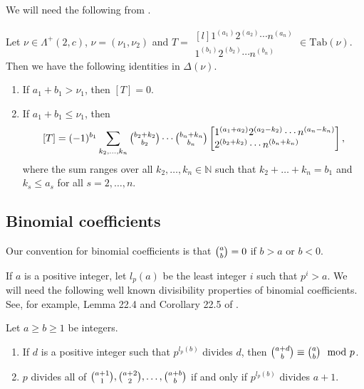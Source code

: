 \documentclass[ALCO,Unicode]{cedram}
\newcommand{\La}{\Lambda}
\numberwithin{equation}{section}
\begin{document}
We will need the following from \cite[Lemma 4.2]{MS3}.
\begin{lemma}\label{lem15}Let $\nu \in \La^+(2,c)$, $\nu=(\nu_1,\nu_2)$ and $T=\begin{matrix*}[l]
		1^{(a_1)}2^{(a_2)}  \cdots   n^{(a_n)} \\
		1^{(b_1)}2^{(b_2)}  \cdots  n^{(b_n)}
	\end{matrix*} \in \mathrm{Tab} (\nu)$.
	Then we have the following identities in $\Delta{(\nu)}$.
	\begin{enumerate}
		\item If $a_1+b_1>\nu_1$, then $[T]=0$.
		\item If $a_1+b_1 \le \nu_1$, then 
		\[[T]=(-1)^{b_1}\sum_{k_2,\dots,k_n}\tbinom{b_2+k_2}{b_2}\cdots\tbinom{b_n+k_n}{b_n}
		\begin{bmatrix*}[l]
			1^{(a_1+a_2)}2^{(a_2-k_2)}  \cdots   n^{(a_n-k_n)} \\
			2^{(b_2+k_2)}  \cdots  n^{(b_n+k_n)}
		\end{bmatrix*},
		\] where the sum ranges over all  $k_2,\dots,k_n \in \mathbb{N}$
		such that  $k_2+\dots+k_n=b_1 $ and $k_s \le a_s$ for all $s=2,\dots,n$.	\end{enumerate}	
\end{lemma}

\subsection{Binomial coefficients}\label{s2.5}
Our convention for binomial coefficients is that $\tbinom{a}{b}=0$ if $b>a$ or $b<0$.

If $a$ is a positive integer, let $l_p(a)$ be the least integer $i$ such that $p^i>a$. We will need the following well known divisibility properties of binomial coefficients. See, for example, Lemma 22.4 and Corollary 22.5 of \cite{Jam}.
\begin{lemma}\label{bin1}
	Let $a \ge b \ge 1$ be integers. \begin{enumerate}
		\item If $d$ is a positive integer such that $ p^{l_p(b)}$ divides $d$, then $\tbinom{a+d}{b} \equiv \tbinom{a}{b} \mod p $.
		\item $p$ divides all of $\tbinom{a+1}{1}, \tbinom{a+2}{2}, \dots, \tbinom{a+b}{b}$ if and only if $p^{l_{p}(b)}$ divides $a+1$.
	\end{enumerate}
\end{lemma}
\end{document}
